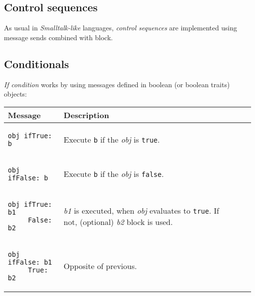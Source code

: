 \documentclass[10pt]{article}
\begin{document}
\begin{multicols*}{3}
\section{Control sequences}
As usual in \textit{Smalltalk-like} languages, \textit{control sequences} are implemented using message sends combined with block.




\subsection{Conditionals}
\textit{If condition} works by using messages defined in boolean (or boolean traits) objects:

\vspace*{0.2cm}

\small{\begin{tabular}{ p{70pt} p{140pt} l l }
Message & Description
\\ \hline %
\begin{lstlisting}
obj ifTrue: b
\end{lstlisting}
&\vspace*{0.25cm}
Execute \texttt{b} if the \textit{obj} is \texttt{true}.

\\ \hline %
\begin{lstlisting}
obj ifFalse: b
\end{lstlisting}
&\vspace*{0.25cm}
Execute \texttt{b} if the \textit{obj} is \texttt{false}.
\\\hline %

\begin{lstlisting}
obj ifTrue: b1
     False: b2
\end{lstlisting}
&\vspace*{0.1cm}
\textit{b1} is executed, when \textit{obj} evaluates to \texttt{true}.
If not, (optional) \textit{b2} block is used.
\\\hline %

\begin{lstlisting}
obj ifFalse: b1
     True: b2
\end{lstlisting}
&\vspace*{0.4cm}
Opposite of previous. 
\\ %
\end{tabular}}





\end{multicols*}
\end{document}
